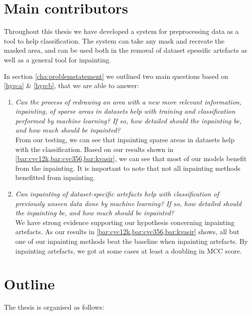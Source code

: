 \section{Main contributors}
Throughout this thesis we have developed a system for preprocessing data as a tool to help classification. 
The system can take any mask and recreate the masked area, and can be used both in the removal of dataset spessific artefacts as well as a general tool for inpainting. 

In section \ref{cha:problemstatement} we outlined two main questions based on \ref{hyp:a} \& \ref{hyp:b}, that we are able to answer:
\begin{enumerate}


\item \textit{Can the process of redrawing an area with a new more relevant information, inpainting, of sparse areas in datasets help with training and classification performed by machine learning? If so, how detailed should the inpainting be, and how much should be inpainted?}\\

From our testing, we can see that inpainting sparse areas in datasets help with the classification. Based on our results shown in \cref{bar:cvc12k,bar:cvc356,bar:kvasir}, we can see that most of our models benefit from the inpainting. It is important to note that not all inpainting methods benefitted from inpainting.



\item \textit{Can inpainting of dataset-specific artefacts help with classification of previously unseen data done by machine learning? If so, how detailed should the inpainting be, and how much should be inpainted?}\\


We have strong evidence supporting our hypothesis concerning inpainting artefacts. As our results in \cref{bar:cvc12k,bar:cvc356,bar:kvasir} shows, all but one of our inpainting methods beat the baseline when inpainting artefacts. By inpainting artefacts, we got at some cases at least a doubling in MCC score.


\end{enumerate}


\section{Outline}
The thesis is organised as follows:

